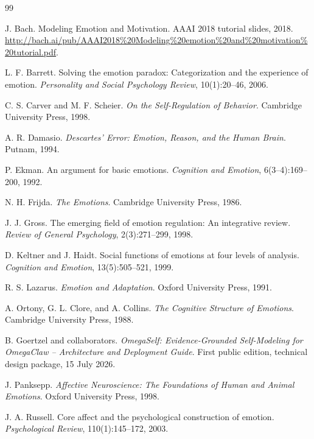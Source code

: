 \documentclass[11pt]{article}
\begin{document}
\begin{thebibliography}{99}

J. Bach.
\newblock Modeling Emotion and Motivation.
\newblock AAAI 2018 tutorial slides, 2018.
\newblock \url{http://bach.ai/pub/AAAI2018%20Modeling%20emotion%20and%20motivation%20tutorial.pdf}.

L. F. Barrett.
\newblock Solving the emotion paradox: Categorization and the experience of emotion.
\newblock \emph{Personality and Social Psychology Review}, 10(1):20--46, 2006.

C. S. Carver and M. F. Scheier.
\newblock \emph{On the Self-Regulation of Behavior}.
\newblock Cambridge University Press, 1998.

A. R. Damasio.
\newblock \emph{Descartes' Error: Emotion, Reason, and the Human Brain}.
\newblock Putnam, 1994.

P. Ekman.
\newblock An argument for basic emotions.
\newblock \emph{Cognition and Emotion}, 6(3--4):169--200, 1992.

N. H. Frijda.
\newblock \emph{The Emotions}.
\newblock Cambridge University Press, 1986.

J. J. Gross.
\newblock The emerging field of emotion regulation: An integrative review.
\newblock \emph{Review of General Psychology}, 2(3):271--299, 1998.

D. Keltner and J. Haidt.
\newblock Social functions of emotions at four levels of analysis.
\newblock \emph{Cognition and Emotion}, 13(5):505--521, 1999.

R. S. Lazarus.
\newblock \emph{Emotion and Adaptation}.
\newblock Oxford University Press, 1991.

A. Ortony, G. L. Clore, and A. Collins.
\newblock \emph{The Cognitive Structure of Emotions}.
\newblock Cambridge University Press, 1988.

B. Goertzel and collaborators.
\newblock \emph{OmegaSelf: Evidence-Grounded Self-Modeling for OmegaClaw --
Architecture and Deployment Guide}.
\newblock First public edition, technical design package, 15 July 2026.

J. Panksepp.
\newblock \emph{Affective Neuroscience: The Foundations of Human and Animal Emotions}.
\newblock Oxford University Press, 1998.

J. A. Russell.
\newblock Core affect and the psychological construction of emotion.
\newblock \emph{Psychological Review}, 110(1):145--172, 2003.


\end{thebibliography}
\end{document}
